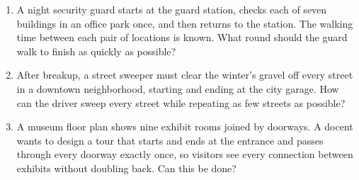\documentclass[12pt]{article}
\begin{document}
\begin{enumerate}

\vfill

\item A night security guard starts at the guard station, checks each of seven buildings in an office park once, and then returns to the station. The walking time between each pair of locations is known. What round should the guard walk to finish as quickly as possible?


\vfill

\item After breakup, a street sweeper must clear the winter's gravel off every street in a downtown neighborhood, starting and ending at the city garage. How can the driver sweep every street while repeating as few streets as possible?



\vfill

\item A museum floor plan shows nine exhibit rooms joined by doorways. A docent wants to design a tour that starts and ends at the entrance and passes through every doorway exactly once, so visitors see every connection between exhibits without doubling back. Can this be done?
\vfill

\end{enumerate}
\end{document}
